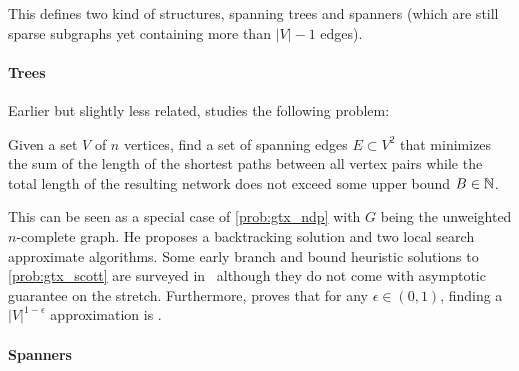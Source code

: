 This defines two kind of structures, spanning trees and spanners (which are still sparse subgraphs
yet containing more than $|V|-1$ edges).

\paragraph{Trees}
\label{par:trees}

Earlier but slightly less related, \textcite{OptimalNetwork69} studies the following problem:
\begin{problem}
  \label{prob:gtx_scott}
  Given a set $V$ of $n$ vertices, find a set of spanning edges $E\subset V^2$ that minimizes
  the sum of the length of the shortest paths  between all vertex pairs while the
  total length of the resulting network does not exceed some upper bound $B\in\mathbb{N}$.
\end{problem}
This can be seen as a special case of \autoref{prob:gtx_ndp} with $G$ being the unweighted
 $n$-complete graph. He proposes a backtracking solution and two local search approximate
algorithms. Some early branch and bound heuristic solutions to \autoref{prob:gtx_scott} are surveyed
in~\autocite[Section 2.3.2]{networkDesignSurvey89} although they do not come with asymptotic
guarantee on the stretch. Furthermore, \textcite{optimApproxNP80} proves that for any $\epsilon \in
(0,1)$, finding a $|V|^{1-\epsilon}$ approximation is \NPc{}.

\paragraph{Spanners}
\label{par:spanners}


